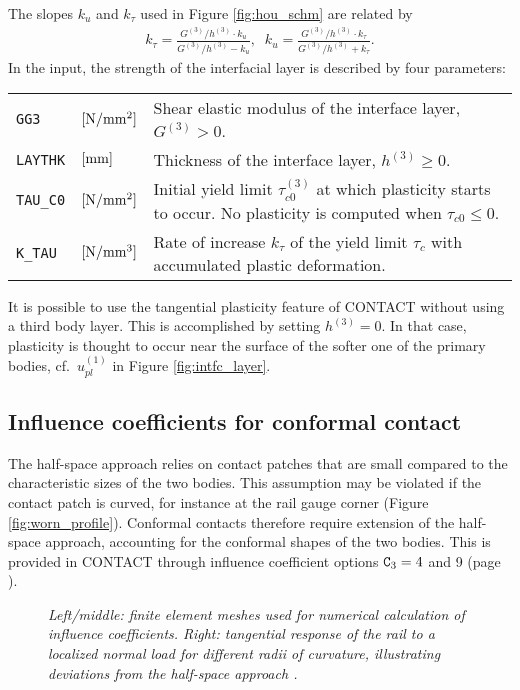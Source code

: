 \documentclass[12pt]{report}
\newenvironment{inputvars}{\vspace{0.4\baselineskip}%

\begin{tabular}{>{\raggedright}p{22mm}p{19mm}p{113mm}}}{
\end{tabular}

}
\newcommand{\inpvar}[3]{{\small\tt #1} & $#2$ & #3 \\[1ex]}
\begin{document}
The slopes $k_u$ and $k_\tau$ used in Figure \ref{fig:hou_schm} are
related by
\begin{eqnarray}
    k_\tau = \frac{G^{(3)}/h^{(3)} \cdot k_u}{G^{(3)}/h^{(3)}-k_u} , \;\;
    k_u = \frac{G^{(3)}/h^{(3)} \cdot k_\tau}{G^{(3)}/h^{(3)}+k_\tau} .
                                                        \label{eq:k_tau}
\end{eqnarray}
In the input, the strength of the interfacial layer is described by four
parameters:
\begin{inputvars}
\inpvar{GG3}{\bunit{N/mm^2}}{Shear elastic modulus of the interface layer,
        $G^{(3)} > 0$.}
\inpvar{LAYTHK}{\bunit{mm}}{Thickness of the interface layer, $h^{(3)}\ge 0$.}
\inpvar{TAU\_C0}{\bunit{N/mm^2}}{Initial yield limit $\tau_{c0}^{(3)}$ at which
        plasticity starts to occur. No plasticity is computed when
        $\tau_{c0}\le 0$.}
\inpvar{K\_TAU}{\bunit{N/mm^3}}{Rate of increase $k_\tau$ of the yield limit
        $\tau_c$ with accumulated plastic deformation.}
\end{inputvars}
It is possible to use the tangential plasticity feature of CONTACT without
using a third body layer. This is accomplished by setting $h^{(3)}=0$.
In that case, plasticity is thought to occur near the surface of the softer
one of the primary bodies, cf.\ $u_{pl}^{(1)}$ in Figure \ref{fig:intfc_layer}.

\subsection{Influence coefficients for conformal contact}
\label{sec:num_infl}

The half-space approach relies on contact patches that are small compared
to the characteristic sizes of the two bodies. This assumption may be
violated if the contact patch is curved, for instance at the rail gauge
corner (Figure \ref{fig:worn_profile}). Conformal contacts therefore
require extension of the half-space approach, accounting for the conformal
shapes of the two bodies. This is provided in CONTACT through influence
coefficient options ${\tt C}_3=4$ and 9 (page \pageref{c3-digit}).

\begin{figure}[bt]
\centering
{}
\hspace{5mm}
\hspace{5mm}
\caption{\em Left/middle: finite element meshes used for numerical
        calculation of influence coefficients. Right: tangential
        response of the rail to a localized normal load for different radii
        of curvature, illustrating deviations from the half-space approach
        \cite{Vollebregt2014d-conformal}.}
\label{fig:quasiquart_mesh}
\end{figure}
\end{document}
